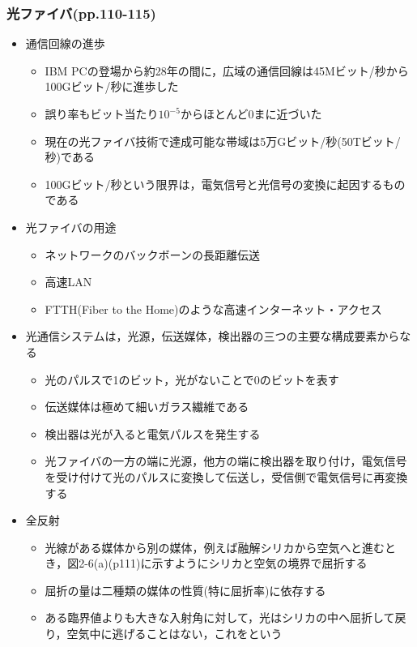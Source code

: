 \documentclass[a4paper]{ltjsarticle}
\begin{document}
		\subsubsection{光ファイバ(pp.110-115)}
			\begin{itemize}
				\item 通信回線の進歩
				\begin{itemize}
					\item IBM PCの登場から約28年の間に，広域の通信回線は45Mビット/秒から100Gビット/秒に進歩した
					\item 誤り率もビット当たり$10^{-5}$からほとんど0まに近づいた
					\item 現在の光ファイバ技術で達成可能な帯域は5万Gビット/秒(50Tビット/秒)である
					\item 100Gビット/秒という限界は，電気信号と光信号の変換に起因するものである
				\end{itemize}
				\item 光ファイバの用途
				\begin{itemize}
					\item ネットワークのバックボーンの長距離伝送
					\item 高速LAN
					\item FTTH(Fiber to the Home)のような高速インターネット・アクセス
				\end{itemize}
				\item 光通信システムは，光源，伝送媒体，検出器の三つの主要な構成要素からなる
				\begin{itemize}
					\item 光のパルスで1のビット，光がないことで0のビットを表す
					\item 伝送媒体は極めて細いガラス繊維である
					\item 検出器は光が入ると電気パルスを発生する
					\item 光ファイバの一方の端に光源，他方の端に検出器を取り付け，電気信号を受け付けて光のパルスに変換して伝送し，受信側で電気信号に再変換する
				\end{itemize}
				\item 全反射
				\begin{itemize}
					\item 光線がある媒体から別の媒体，例えば融解シリカから空気へと進むとき，図2-6(a)(p111)に示すようにシリカと空気の境界で屈折する
					\item 屈折の量は二種類の媒体の性質(特に屈折率)に依存する
					\item ある臨界値よりも大きな入射角に対して，光はシリカの中へ屈折して戻り，空気中に逃げることはない，これをという

\end{itemize}
\end{itemize}
\end{document}
